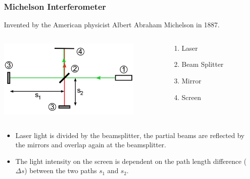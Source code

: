 \documentclass{beamer}
\begin{document}
\begin{frame}\frametitle{Michelson Interferometer}

Invented by the American physicist Albert Abraham Michelson in 1887.

\begin{columns}
\begin{column}{7cm}
\begin{center}
\includegraphics[width=7cm]{fig/mint.jpg}
\end{center}
\end{column}
\begin{column}{3cm}
\begin{enumerate}
\item Laser
\item Beam Splitter
\item Mirror
\item Screen
\end{enumerate}
\end{column}
\end{columns}

\begin{itemize}
\item Laser light is divided by the beamsplitter, the partial beams are reflected by the mirrors and overlap again at the beamsplitter.
\item The light intensity on the screen is dependent on the path length difference ($\Delta s$) between the two paths $s_1$ and $s_2$. 
\end{itemize}
\end{frame}
\end{document}
